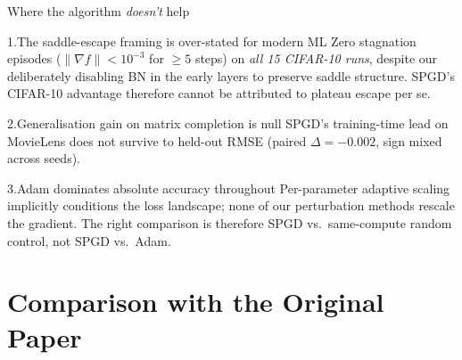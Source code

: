 \documentclass[11pt,aspectratio=169]{beamer}
\begin{document}
\begin{frame}{Where the algorithm \emph{doesn't} help}
  \begin{block}{1.\;The saddle-escape framing is over-stated for modern ML}
    \alert{Zero stagnation episodes} ($\|\nabla f\|<10^{-3}$ for $\geq5$ steps)
    on \emph{all 15 CIFAR-10 runs}, despite our deliberately disabling BN in
    the early layers to preserve saddle structure. SPGD's CIFAR-10 advantage
    therefore cannot be attributed to plateau escape per se.
  \end{block}

  \vspace{0.4em}
  \begin{block}{2.\;Generalisation gain on matrix completion is null}
    SPGD's training-time lead on MovieLens does not survive to held-out
    RMSE (paired $\Delta = -0.002$, sign mixed across seeds).
  \end{block}

  \vspace{0.4em}
  \begin{block}{3.\;Adam dominates absolute accuracy throughout}
    Per-parameter adaptive scaling implicitly conditions the loss landscape;
    none of our perturbation methods rescale the gradient. The right
    comparison is therefore SPGD vs.\ same-compute random control,
    not SPGD vs.\ Adam.
  \end{block}
\end{frame}


\section{Comparison with the Original Paper}
\end{document}
